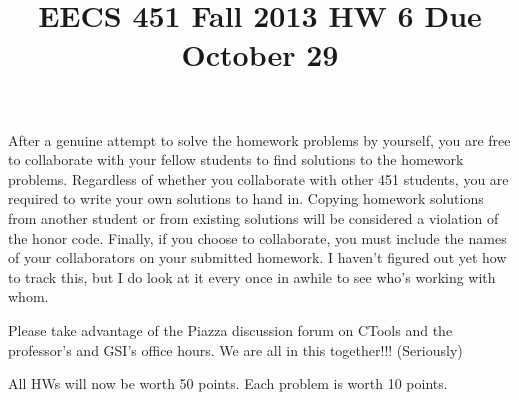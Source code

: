 \documentclass[draft]{siamltex}
\title{EECS 451 Fall 2013 HW 6 \hspace{1.2cm} Due October 29}
\begin{document}
%
\maketitle

After a genuine attempt to solve the homework problems by yourself, you are free to collaborate with your fellow students to find solutions to the homework problems. Regardless of whether you collaborate with other 451 students, you are required to write your own solutions to hand in. Copying homework solutions from another student or from existing solutions will be considered a violation of the honor code. Finally, if you choose to collaborate, you must include the names of your collaborators on your submitted homework. I haven't figured out yet how to track this, but I do look at it every once in awhile to see who's working with whom.

\vspace{2mm} 

Please take advantage of the Piazza discussion forum on CTools and the professor's and GSI's office hours. We are all in this together!!! (Seriously)


\vspace{2mm}
All HWs will now be worth 50 points. Each problem is worth 10 points.

\vspace{5mm}
\end{document}

